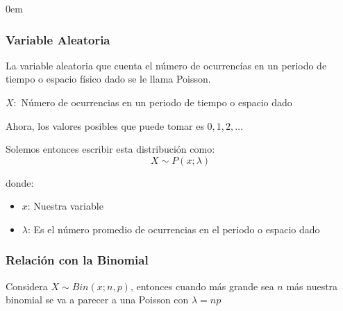 \documentclass[12pt, fleqn]{report}                             %
\newenvironment{SmallIndentation}[1][0.75em]                    %
        {\begin{adjustwidth}{#1}{}\begin{footnotesize}}             %
        {\end{footnotesize}\end{adjustwidth}}                       %
\theoremstyle{break}                                            %
\begin{document}
                \begin{multicols}{2}
                \begin{SmallIndentation}[0em]


                    \subsubsection{Variable Aleatoria}

                        La variable aleatoria que cuenta el número de ocurrencías en un periodo
                        de tiempo o espacio físico dado se le llama Poisson.

                        $X : $ Número de ocurrencias en un periodo de tiempo o espacio dado

                        Ahora, los valores posibles que puede tomar es $0, 1, 2, \dots$

                        Solemos entonces escribir esta distribución como:
                        \begin{equation*}
                            X \sim P(x; \lambda)
                        \end{equation*}

                        donde:
                        \begin{itemize}
                            \item $x$: Nuestra variable
                            \item $\lambda$: Es el número promedio de ocurrencias en el periodo o espacio dado
                        \end{itemize}


                    \subsubsection{Relación con la Binomial}

                        Considera $X \sim Bin(x; n, p)$, entonces cuando más grande sea $n$ más nuestra binomial se 
                        va a parecer a una Poisson con $\lambda = np$



\end{SmallIndentation}
\end{multicols}
\end{document}

